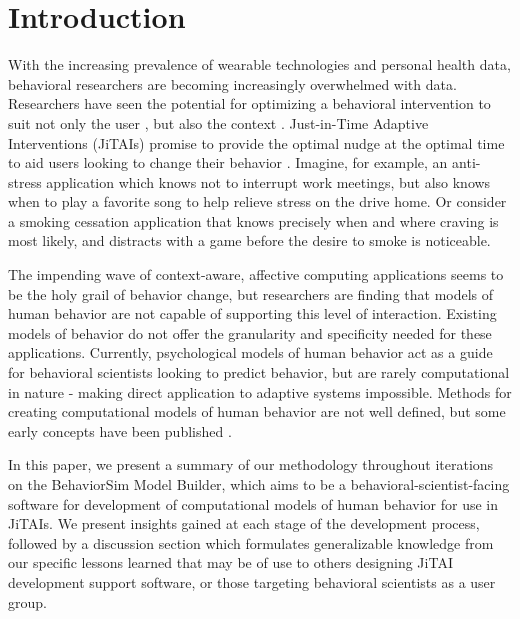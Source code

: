 \documentclass{sigchi}
\begin{document}


\section{Introduction}
With the increasing prevalence of wearable technologies and personal health data, behavioral researchers are becoming increasingly overwhelmed with data.
Researchers have seen the potential for optimizing a behavioral intervention to suit not only the user \cite{dallery2014optimizing, beck2010challenges}, but also the context \cite{brailsford2010towards, collins2004}. 
Just-in-Time Adaptive Interventions (JiTAIs) promise to provide the optimal nudge at the optimal time to aid users looking to change their behavior \cite{nahum2014}.
Imagine, for example, an anti-stress application which knows not to interrupt work meetings, but also knows when to play a favorite song to help relieve stress on the drive home.
Or consider a smoking cessation application that knows precisely when and where craving is most likely, and distracts with a game before the desire to smoke is noticeable.

The impending wave of context-aware\cite{schilit1994context}, affective computing\cite{picard2000affective} applications seems to be the holy grail of behavior change, but researchers are finding that models of human behavior are not capable of supporting this level of interaction.
Existing  models of behavior do not offer the granularity and specificity needed for these applications\cite{riley2011health}.
Currently, psychological models of human behavior act as a guide for behavioral scientists looking to predict behavior, but are rarely computational in nature - making direct application to adaptive systems impossible.
Methods for creating computational models of human behavior are not well defined, but some early concepts have been published \cite{rivera2013systems}.

In this paper, we present a summary of our methodology throughout iterations on the BehaviorSim Model Builder, which aims to be a behavioral-scientist-facing software for development of computational models of human behavior for use in JiTAIs.
We present insights gained at each stage of the development process, followed by a discussion section which formulates generalizable knowledge from our specific lessons learned that may be of use to others designing JiTAI development support software, or those targeting behavioral scientists as a user group.
\end{document}
